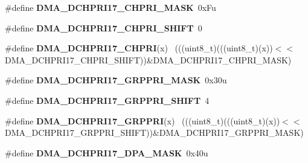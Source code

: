 \begin{DoxyCompactItemize}
\item 
\hypertarget{group___d_m_a___register___masks_gafd1ca54f2477d8fd57aa02e15f76e6ff}{}\#define {\bfseries D\+M\+A\+\_\+\+D\+C\+H\+P\+R\+I17\+\_\+\+C\+H\+P\+R\+I\+\_\+\+M\+A\+S\+K}~0x\+Fu\label{group___d_m_a___register___masks_gafd1ca54f2477d8fd57aa02e15f76e6ff}

\item 
\hypertarget{group___d_m_a___register___masks_ga0b89e29cf6af5eef4d1d2e5c91a554fe}{}\#define {\bfseries D\+M\+A\+\_\+\+D\+C\+H\+P\+R\+I17\+\_\+\+C\+H\+P\+R\+I\+\_\+\+S\+H\+I\+F\+T}~0\label{group___d_m_a___register___masks_ga0b89e29cf6af5eef4d1d2e5c91a554fe}

\item 
\hypertarget{group___d_m_a___register___masks_gad02c0ad2f86d27aae67ed138a5e0edfd}{}\#define {\bfseries D\+M\+A\+\_\+\+D\+C\+H\+P\+R\+I17\+\_\+\+C\+H\+P\+R\+I}(x)                                    ~(((uint8\+\_\+t)(((uint8\+\_\+t)(x))$<$$<$D\+M\+A\+\_\+\+D\+C\+H\+P\+R\+I17\+\_\+\+C\+H\+P\+R\+I\+\_\+\+S\+H\+I\+F\+T))\&D\+M\+A\+\_\+\+D\+C\+H\+P\+R\+I17\+\_\+\+C\+H\+P\+R\+I\+\_\+\+M\+A\+S\+K)\label{group___d_m_a___register___masks_gad02c0ad2f86d27aae67ed138a5e0edfd}

\item 
\hypertarget{group___d_m_a___register___masks_gad7c9dc16e4c699f73015c0f1307aa9a0}{}\#define {\bfseries D\+M\+A\+\_\+\+D\+C\+H\+P\+R\+I17\+\_\+\+G\+R\+P\+P\+R\+I\+\_\+\+M\+A\+S\+K}~0x30u\label{group___d_m_a___register___masks_gad7c9dc16e4c699f73015c0f1307aa9a0}

\item 
\hypertarget{group___d_m_a___register___masks_ga4ad6b25288a19dfd280473daecf147de}{}\#define {\bfseries D\+M\+A\+\_\+\+D\+C\+H\+P\+R\+I17\+\_\+\+G\+R\+P\+P\+R\+I\+\_\+\+S\+H\+I\+F\+T}~4\label{group___d_m_a___register___masks_ga4ad6b25288a19dfd280473daecf147de}

\item 
\hypertarget{group___d_m_a___register___masks_ga915e38cc3c8e7d13674231159f432c69}{}\#define {\bfseries D\+M\+A\+\_\+\+D\+C\+H\+P\+R\+I17\+\_\+\+G\+R\+P\+P\+R\+I}(x)                                  ~(((uint8\+\_\+t)(((uint8\+\_\+t)(x))$<$$<$D\+M\+A\+\_\+\+D\+C\+H\+P\+R\+I17\+\_\+\+G\+R\+P\+P\+R\+I\+\_\+\+S\+H\+I\+F\+T))\&D\+M\+A\+\_\+\+D\+C\+H\+P\+R\+I17\+\_\+\+G\+R\+P\+P\+R\+I\+\_\+\+M\+A\+S\+K)\label{group___d_m_a___register___masks_ga915e38cc3c8e7d13674231159f432c69}

\item 
\hypertarget{group___d_m_a___register___masks_ga8f4f0581c67b95efae97d5654b424684}{}\#define {\bfseries D\+M\+A\+\_\+\+D\+C\+H\+P\+R\+I17\+\_\+\+D\+P\+A\+\_\+\+M\+A\+S\+K}~0x40u\label{group___d_m_a___register___masks_ga8f4f0581c67b95efae97d5654b424684}


\end{DoxyCompactItemize}

